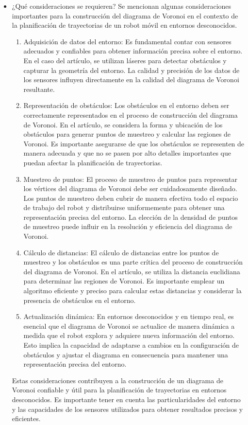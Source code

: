 \documentclass{article}
\begin{document}
\begin{itemize}
\item ¿Qué consideraciones se requieren?
  Se mencionan algunas consideraciones importantes para la construcción del diagrama de Voronoi en el contexto de la planificación de trayectorias de un robot móvil en entornos desconocidos.

  \begin{enumerate}
  \item Adquisición de datos del entorno: Es fundamental contar con sensores adecuados y confiables para obtener información precisa sobre el entorno. En el caso del artículo, se utilizan láseres para detectar obstáculos y capturar la geometría del entorno. La calidad y precisión de los datos de los sensores influyen directamente en la calidad del diagrama de Voronoi resultante.
  \item Representación de obstáculos: Los obstáculos en el entorno deben ser correctamente representados en el proceso de construcción del diagrama de Voronoi. En el artículo, se considera la forma y ubicación de los obstáculos para generar puntos de muestreo y calcular las regiones de Voronoi. Es importante asegurarse de que los obstáculos se representen de manera adecuada y que no se pasen por alto detalles importantes que puedan afectar la planificación de trayectorias.
  \item Muestreo de puntos: El proceso de muestreo de puntos para representar los vértices del diagrama de Voronoi debe ser cuidadosamente diseñado. Los puntos de muestreo deben cubrir de manera efectiva todo el espacio de trabajo del robot y distribuirse uniformemente para obtener una representación precisa del entorno. La elección de la densidad de puntos de muestreo puede influir en la resolución y eficiencia del diagrama de Voronoi.
  \item Cálculo de distancias: El cálculo de distancias entre los puntos de muestreo y los obstáculos es una parte crítica del proceso de construcción del diagrama de Voronoi. En el artículo, se utiliza la distancia euclidiana para determinar las regiones de Voronoi. Es importante emplear un algoritmo eficiente y preciso para calcular estas distancias y considerar la presencia de obstáculos en el entorno.
  \item Actualización dinámica: En entornos desconocidos y en tiempo real, es esencial que el diagrama de Voronoi se actualice de manera dinámica a medida que el robot explora y adquiere nueva información del entorno. Esto implica la capacidad de adaptarse a cambios en la configuración de obstáculos y ajustar el diagrama en consecuencia para mantener una representación precisa del entorno.
  \end{enumerate}

  Estas consideraciones contribuyen a la construcción de un diagrama de Voronoi confiable y útil para la planificación de trayectorias en entornos desconocidos. Es importante tener en cuenta las particularidades del entorno y las capacidades de los sensores utilizados para obtener resultados precisos y eficientes.
  
\end{itemize}
\end{document}
